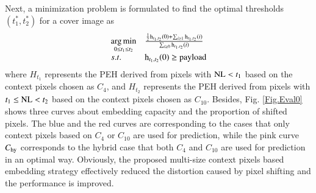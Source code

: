 \documentclass[review,3p,10pt,sort&compress]{elsarticle}
\begin{document}
Next, a minimization problem is formulated to find the optimal thresholds $(t_1^*, t_2^*)$ for a cover image as
\begin{equation}\label{eq:thresholds}
\begin{array}{ll}
\mathop{\arg\min}\limits_{0 \leq t_1 \leq t_2} & \frac{\frac{1}{2}{\rm h}_{t_1, t_2}(0) + \sum_{i \geq 1}{\rm h}_{t_1, t_2}(i)}{\sum_{i \geq 0}{\rm h}_{t_1, t_2}(i)}\\
s.t.                                    & {\rm h}_{t_1, t_2}(0) \geq \text{payload}
\end{array}
\end{equation}
where $H_{t_1}$ represents the PEH derived from pixels with ${\rm NL} < t_1$ based on the context pixels chosen as $C_4$, and $H_{t_2}$ represents the PEH derived from pixels with $t_1 \leq {\rm NL} < t_2$ based on the context pixels chosen as $C_{10}$. %
Besides, Fig. \ref{Fig.Eval0} shows three curves about embedding capacity and the proportion of shifted pixels. The blue and the red curves are corresponding to the cases that only context pixels based on $C_4$ or $C_{10}$ are used for prediction, while the pink curve $C_{\rm hy}$ corresponds to the hybrid case that both $C_4$ and $C_{10}$ are used for prediction in an optimal way. Obviously, the proposed multi-size context pixels based embedding strategy effectively reduced the distortion caused by pixel shifting and the performance is improved.
\end{document}

